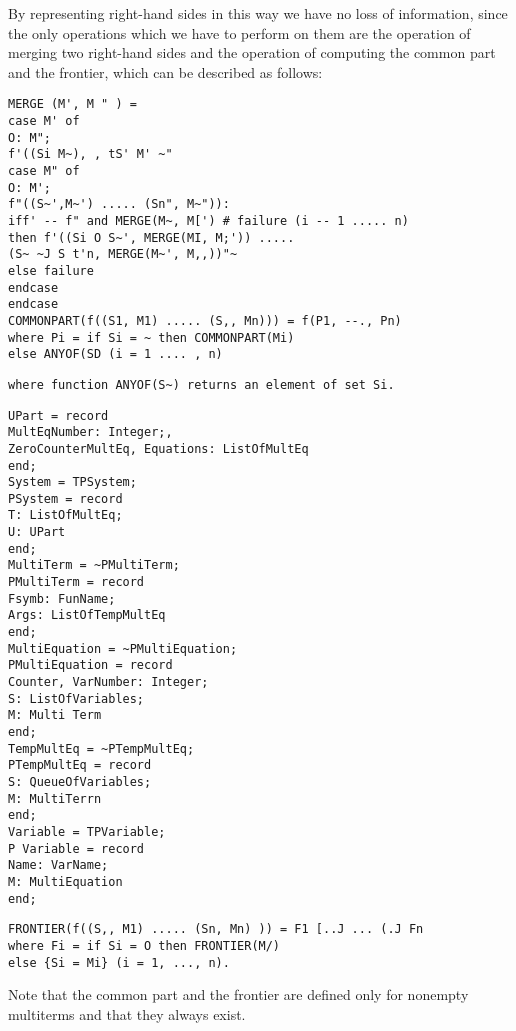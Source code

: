  By representing right-hand sides in this way we have no loss of information,
since the only operations which we have to perform on them are the operation of
merging two right-hand sides and the operation of computing the common part
and the frontier, which can be described as follows:
\begin{verbatim}
MERGE (M', M " ) =
case M' of
O: M";
f'((Si M~), , tS' M' ~"
case M" of
O: M';
f"((S~',M~') ..... (Sn", M~")):
iff' -- f" and MERGE(M~, M[') # failure (i -- 1 ..... n)
then f'((Si O S~', MERGE(MI, M;')) .....
(S~ ~J S t'n, MERGE(M~', M,,))"~
else failure
endcase
endcase
COMMONPART(f((S1, M1) ..... (S,, Mn))) = f(P1, --., Pn)
where Pi = if Si = ~ then COMMONPART(Mi)
else ANYOF(SD (i = 1 .... , n) 
\end{verbatim}
\begin{verbatim}
where function ANYOF(S~) returns an element of set Si. 
\end{verbatim}
\begin{verbatim}
UPart = record
MultEqNumber: Integer;,
ZeroCounterMultEq, Equations: ListOfMultEq
end;
System = TPSystem;
PSystem = record
T: ListOfMultEq;
U: UPart
end;
MultiTerm = ~PMultiTerm;
PMultiTerm = record
Fsymb: FunName;
Args: ListOfTempMultEq
end;
MultiEquation = ~PMultiEquation;
PMultiEquation = record
Counter, VarNumber: Integer;
S: ListOfVariables;
M: Multi Term
end;
TempMultEq = ~PTempMultEq;
PTempMultEq = record
S: QueueOfVariables;
M: MultiTerrn
end;
Variable = TPVariable;
P Variable = record
Name: VarName;
M: MultiEquation
end; 
\end{verbatim}
\begin{verbatim}
FRONTIER(f((S,, M1) ..... (Sn, Mn) )) = F1 [..J ... (.J Fn
where Fi = if Si = O then FRONTIER(M/)
else {Si = Mi} (i = 1, ..., n). 
\end{verbatim}

Note that the common part and the frontier are defined only for nonempty
multiterms and that they always exist. 
